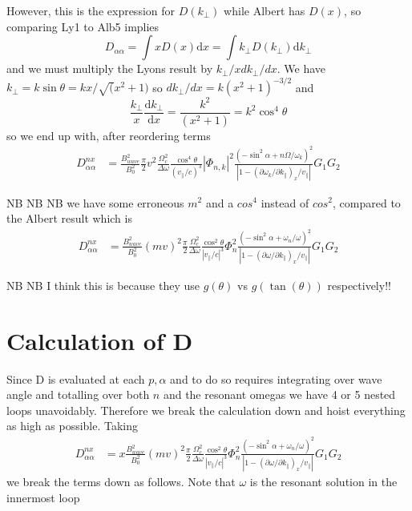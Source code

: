 \documentclass[]{article}
\begin{document}
However, this is the expression for $D(k_\perp)$ while Albert has $D(x)$, so comparing Ly1 to Alb5 implies
\begin{equation}
D_{\alpha\alpha} = \int x D(x) \mathrm{d}x = \int k_\perp D(k_\perp) \mathrm{d} k_\perp
\end{equation}
and we must multiply the Lyons result by $k_\perp/x dk_\perp/dx$. 
We have $k_\perp = k \sin \theta = k x /\sqrt(x^2 +1)$ so $dk_\perp/dx = k (x^2+1)^{-3/2}$ and
\[ \frac{k_\perp}{x}\frac{\mathrm{d} k_\perp}{\mathrm{d} x} = \frac{k^2}{(x^2+1)}  = k^2 \cos^4\theta\]
so we end up with, after reordering terms
\begin{align}\label{LyEnd}
D_{\alpha\alpha}^{nx} &= \frac{B^2_{wave}}{B_0^2} \frac{\pi}{2} v^2 \frac{ \Omega_c^2 }{\Delta \omega}\frac{\cos^4\theta}{(v_\parallel/c)^3} |\Phi_{n,k}|^2 \frac{ (-\sin^2\alpha + n \Omega/\omega_k)^2}{ |1-(\partial \omega_k/\partial k_\parallel)_x/v_\parallel|} G_1 G_2
\end{align}

NB NB NB we have some erroneous $m^2$ and a $cos^4$ instead of $cos^2$, compared to the Albert result which is
\begin{align}
D_{\alpha\alpha}^{nx} &= \frac{B_{wave}^2}{B_0^2}(mv)^2 \frac{\pi}{2}\frac{\Omega_c^2}{\Delta\omega}\frac{\cos^2\theta}{|v_\parallel/c|^3}  \Phi_n^2 \frac{(-\sin^2\alpha + \omega_n/\omega)^2}{|1-(\partial \omega/\partial k_\parallel)_x/v_\parallel|} G_1 G_2 \end{align}

NB NB I think this is because they use $g(\theta)$ vs $g(\tan(\theta))$ respectively!!

\section{Calculation of D}

Since D is evaluated at each $p, \alpha$ and to do so requires integrating over wave angle and totalling over both $n$ and the resonant omegas we have 4 or 5 nested loops unavoidably. Therefore we break the calculation down and hoist everything as high as possible. Taking
\begin{align}
D_{\alpha\alpha}^{nx} &= x \frac{B_{wave}^2}{B_0^2}(mv)^2 \frac{\pi}{2}\frac{\Omega_c^2}{\Delta\omega}\frac{\cos^2\theta}{|v_\parallel/c|^3}  \Phi_n^2 \frac{(-\sin^2\alpha + \omega_n/\omega)^2}{|1-(\partial \omega/\partial k_\parallel)_x/v_\parallel|} G_1 G_2 \end{align}
we break the terms down as follows. Note that $\omega$ is the resonant solution in the innermost loop
\end{document}

